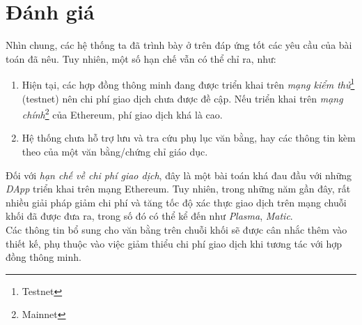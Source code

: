 \clearpage
\newpage
\section{Đánh giá}

Nhìn chung, các hệ thống ta đã trình bày ở trên đáp ứng tốt các yêu cầu của bài toán đã nêu. Tuy nhiên, một số hạn chế vẫn có thể chỉ ra, như:
\begin{enumerate}
    \item Hiện tại, các hợp đồng thông minh đang được triển khai trên \textit{mạng kiểm thử}\footnote{Testnet} (testnet) nên chi phí giao dịch chưa được đề cập. Nếu triển khai trên \textit{mạng chính}\footnote{Mainnet} của Ethereum, phí giao dịch khá là cao.\label{cons/transaction-fee}
    \item Hệ thống chưa hỗ trợ lưu và tra cứu phụ lục văn bằng, hay các thông tin kèm theo của một văn bằng/chứng chỉ giáo dục.
\end{enumerate}

Đối với \textit{hạn chế về chi phí giao dịch}, đây là một bài toán khá đau đầu với những \textit{DApp} triển khai trên mạng Ethereum. Tuy nhiên, trong những năm gần đây, rất nhiều giải pháp giảm chi phí và tăng tốc độ xác thực giao dịch trên mạng chuỗi khối đã được đưa ra, trong số đó có thể kể đến như \textit{Plasma}, \textit{Matic}.\\

Các thông tin bổ sung cho văn bằng trên chuỗi khối sẽ được cân nhắc thêm vào thiết kế, phụ thuộc vào việc giảm thiểu chi phí giao dịch khi tương tác với hợp đồng thông minh.